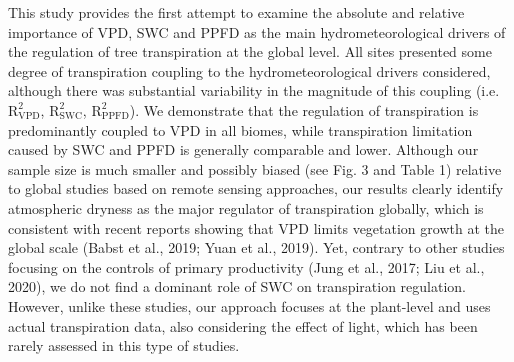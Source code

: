 \documentclass[11pt,twoside]{reedthesis}
\begin{document}
This study provides the first attempt to examine the absolute and
relative importance of VPD, SWC and PPFD as the main hydrometeorological
drivers of the regulation of tree transpiration at the global level. All
sites presented some degree of transpiration coupling to the
hydrometeorological drivers considered, although there was substantial
variability in the magnitude of this coupling (i.e.
\(\text{R}^2_{\text{VPD}}\), \(\text{R}^2_{\text{SWC}}\),
\(\text{R}^2_{\text{PPFD}}\)). We demonstrate that the regulation of
transpiration is predominantly coupled to VPD in all biomes, while
transpiration limitation caused by SWC and PPFD is generally comparable
and lower. Although our sample size is much smaller and possibly biased
(see Fig. 3 and Table 1) relative to global studies based on remote
sensing approaches, our results clearly identify atmospheric dryness as
the major regulator of transpiration globally, which is consistent with
recent reports showing that VPD limits vegetation growth at the global
scale (Babst et al., 2019; Yuan et al., 2019). Yet, contrary to other
studies focusing on the controls of primary productivity (Jung et al.,
2017; Liu et al., 2020), we do not find a dominant role of SWC on
transpiration regulation. However, unlike these studies, our approach
focuses at the plant-level and uses actual transpiration data, also
considering the effect of light, which has been rarely assessed in this
type of studies.\par
\end{document}
